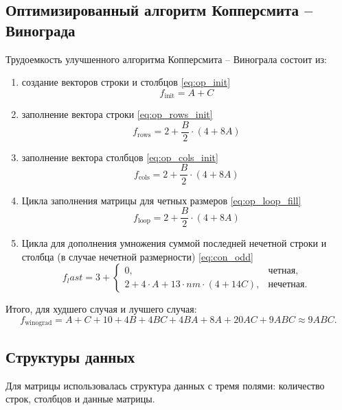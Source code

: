 \subsection{Оптимизированный алгоритм Копперсмита -- Винограда}
Трудоемкость улучшенного алгоритма Копперсмита -- Винограла состоит из: 
\begin{enumerate}[1.]
    \item создание векторов строки и столбцов \ref{eq:op_init}
    \begin{equation}
        f_{\text{init}} = A + C
        \label{eq:op_init}
    \end{equation}
    \item заполнение вектора строки \ref{eq:op_rows_init}
    \begin{equation}
        f_{\text{rows}} = 2 + \frac{B}{2}\cdot(4+8A)
        \label{eq:op_rows_init}
    \end{equation}
    \item заполнение вектора столбцов \ref{eq:op_cols_init}
    \begin{equation}
        f_{\text{cols}} = 2 + \frac{B}{2}\cdot(4+8A)
        \label{eq:op_cols_init}
    \end{equation}
    \item Цикла заполнения матрицы для четных размеров \ref{eq:op_loop_fill}
    \begin{equation}
        f_{\text{loop}} = 2 + \frac{B}{2}\cdot(4+8A)
        \label{eq:op_loop_fill}
    \end{equation}
    \item Цикла для дополнения умножения суммой последней нечетной строки и столбца (в случае нечетной размерности) \ref{eq:con_odd}
    \begin{equation}
        f_last = 3 + \begin{cases}
            0,& \text{четная},\\
            2 + 4 \cdot A + 13 \cdot nm \cdot (4 + 14C),& \text{нечетная}.
        \end{cases}
    \end{equation}
\end{enumerate}

Итого, для худшего случая и лучшего случая: 
\begin{equation}
    f_\text{winograd} = A + C + 10 + 4B + 4BC + 4BA + 8A + 20AC + 9ABC \approx 9ABC.
\end{equation}


\subsection{Структуры данных}
Для матрицы использовалась структура данных с тремя полями: количество строк, столбцов и данные матрицы.

